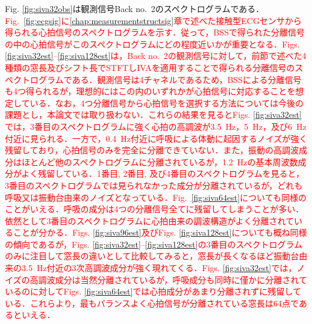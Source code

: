 Fig. \ref{fig:siva32obs}は観測信号Back no.~2のスペクトログラムである．\textcolor{red}{Fig.~\ref{fig:ecgsig}に\ref{chap:measurementstructsig}章で述べた接触型ECGセンサから得られる心拍信号のスペクトログラムを示す．従って，BSSで得られた分離信号の中の心拍信号がこのスペクトログラムにどの程度近いかが重要となる．Figs. \ref{fig:siva32est}--\ref{fig:siva128est}は，Back no.~2の観測信号に対して，前節で述べた4種類の窓長及びシフト長でSTFTしIVAを適用することで得られる分離信号のスペクトログラムである．観測信号は4チャネルであるため，BSSによる分離信号も4つ得られるが，理想的にはこの内のいずれかが心拍信号に対応することを想定している．なお，4つ分離信号から心拍信号を選択する方法については今後の課題とし，本論文では取り扱わない．これらの結果を見るとFigs. \ref{fig:siva32est}では，3番目のスペクトログラムに強く心拍の高調波が3.5~Hz，5~Hz，及び6~Hz付近に見られる．一方で，0.4~Hz付近に呼吸による体動に起因するノイズが強く残留しており，心拍信号のみを完全に分離できていない．また，振動の高調波成分はほとんど他のスペクトログラムに分離されているが，1.2~Hzの基本周波数成分がよく残留している．1番目, 2番目, 及び4番目のスペクトログラムを見ると，3番目のスペクトログラムでは見られなかった成分が分離されているが，どれも呼吸又は振動台由来のノイズとなっている．Fig.~\ref{fig:siva64est}についても同様のことがいえる．呼吸の成分は4つの分離信号全てに残留してしまうことが多い．依然として3番目のスペクトログラムに心拍由来の調波構造がよく分離されていることが分かる．Figs. \ref{fig:siva96est}及びFigs. \ref{fig:siva128est}についても概ね同様の傾向であるが，Figs. \ref{fig:siva32est}--\ref{fig:siva128est}の3番目のスペクトログラムのみに注目して窓長の違いとして比較してみると，窓長が長くなるほど振動台由来の3.5~Hz付近の3次高調波成分が強く現れてくる．Figs. \ref{fig:siva32est}では，ノイズの高調波成分は当然分離されているが，呼吸成分も同時に僅かに分離されているのに対してFigs. \ref{fig:siva64est}では心拍成分があまり分離されずに残留している．これらより，最もバランスよく心拍信号が分離されている窓長は64点であるといえる．}

